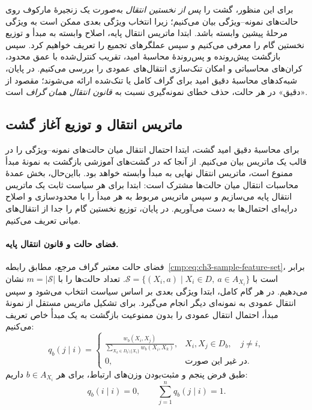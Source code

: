 برای این منظور، گشت را \emph{پس از نخستین انتقال}
به‌صورت یک زنجیرهٔ مارکوف روی حالت‌های
نمونه--ویژگی بیان می‌کنیم؛ زیرا انتخاب ویژگی
بعدی ممکن است به ویژگی مرحلهٔ پیشین وابسته باشد.
ابتدا ماتریس انتقال پایه، اصلاح وابسته به مبدأ
و توزیع نخستین گام را معرفی می‌کنیم و سپس
عملگرهای تجمیع را تعریف خواهیم کرد. سپس بازگشت پیش‌رونده و
پس‌روندهٔ محاسبهٔ امید، تقریب کنترل‌شده با
عمق محدود، کران‌های محاسباتی و امکان تنک‌سازی
انتقال‌های عمودی را بررسی می‌کنیم. در پایان،
شبه‌کدهای محاسبهٔ دقیق امید برای گراف کامل یا
تنک‌شده ارائه می‌شوند؛ مقصود از «دقیق» در هر
حالت، حذف خطای نمونه‌گیری نسبت به \emph{قانون
انتقال همان گراف} است.

\subsection{ماتریس انتقال و توزیع آغاز گشت}
\label{cmp:subsec:ch3-block-matrix-transition}
برای محاسبهٔ دقیق امید گشت، ابتدا احتمال انتقال میان
حالت‌های نمونه--ویژگی را در قالب یک ماتریس بیان می‌کنیم.
از آنجا که در گشت‌های آموزشی بازگشت به نمونهٔ مبدأ
ممنوع است، ماتریس انتقال نهایی به مبدأ وابسته خواهد بود.
بااین‌حال، بخش عمدهٔ محاسبات انتقال میان حالت‌ها مشترک
است: ابتدا برای هر سیاست ثابت یک ماتریس انتقال پایه
می‌سازیم و سپس ماتریس مربوط به هر مبدأ را با
محدودسازی و اصلاح درایه‌ای احتمال‌ها به دست می‌آوریم.
در پایان، توزیع نخستین گام را جدا از انتقال‌های میانی
تعریف می‌کنیم.

\paragraph{فضای حالت و قانون انتقال پایه.}
فضای حالت معتبر گراف مرجع، مطابق
رابطه~\eqref{cmp:eq:ch3-sample-feature-set}، برابر است با
$\mathcal S=\{(X_i,a)\mid X_i\in D,\ a\in A_{X_i}\}$.
تعداد حالت‌ها را با $m=|\mathcal S|$ نشان می‌دهیم.
در هر گام کامل، ابتدا ویژگی بعدی بر اساس سیاست انتخاب
می‌شود و سپس انتقال عمودی به نمونه‌ای دیگر انجام می‌گیرد.
برای تشکیل ماتریس مستقل از نمونهٔ مبدأ، احتمال انتقال
عمودی را بدون ممنوعیت بازگشت به یک مبدأٔ خاص تعریف می‌کنیم:
\begin{equation}\label{cmp:eq:ch3-base-vertical-transition}
\boxed{
q_b(j\mid i)=
\begin{cases}
\displaystyle
\frac{w_b(X_i,X_j)}
{\sum\limits_{X_k\in D_b\setminus\{X_i\}}w_b(X_i,X_k)},
&X_i,X_j\in D_b,\quad j\ne i,\\[6pt]
0,&\text{در غیر این صورت}.
\end{cases}
}
\end{equation}
طبق فرض پنجم و مثبت‌بودن وزن‌های ارتباط، برای هر
$b\in A_{X_i}$ داریم:
\[
q_b(i\mid i)=0,\qquad \sum_{j=1}^{n}q_b(j\mid i)=1.
\]

